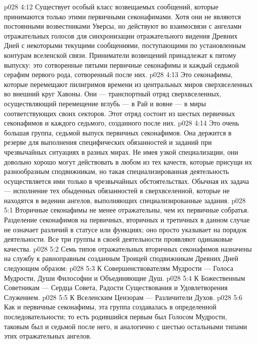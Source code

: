 \vs p028 4:12 \bibnobreakspace {} Существует особый класс возвещаемых сообщений, которые принимаются только этими первичными секонафимами. Хотя они не являются постоянными возвестниками Уверсы, но действуют во взаимосвязи с ангелами отражательных голосов для синхронизации отражательного видения Древних Дней с некоторыми текущими сообщениями, поступающими по установленным контурам вселенской связи. Приниматели возвещений принадлежат к пятому выпуску: это сотворенные пятыми первичные секонафимы и каждый седьмой серафим первого рода, сотворенный после них.
\vs p028 4:13 \bibnobreakspace {} Это секонафимы, которые перемещают пилигримов времени из центральных миров сверхвселенных во внешний круг Хавоны. Они --- транспортный отряд сверхвселенных, осуществляющий перемещение вглубь --- в Рай и вовне --- в миры соответствующих своих секторов. Этот отряд состоит из шестых первичных секонафимов и каждого седьмого, созданного после них.
\vs p028 4:14 \bibnobreakspace {} Это очень большая группа, седьмой выпуск первичных секонафимов. Она держится в резерве для выполнения специфических обязанностей и заданий при чрезвычайных ситуациях в разных мирах. Не имея узкой специализации, они довольно хорошо могут действовать в любом из тех качеств, которые присущи их разнообразным сподвижникам, но такая специализированная деятельность осуществляется ими только в чрезвычайных обстоятельствах. Обычная их задача --- исполнение тех обыденных обязанностей в сверхвселенной, которые не находятся в ведении ангелов, выполняющих специализированные задания.
\vs p028 5:1 Вторичные секонафимы не менее отражательны, чем их первичные собратья. Разделение секонафимов на первичных, вторичных и третичных в данном случае не означает различий в статусе или функциях; оно просто указывает на порядок деятельности. Все три группы в своей деятельности проявляют одинаковые качества.
\vs p028 5:2 \pc Семь типов отражательных вторичных секонафимов назначены на службу к равноправным созданным Троицей сподвижникам Древних Дней следующим образом:
\vs p028 5:3 К Совершенствователям Мудрости --- Голоса Мудрости, Души Философии и Объединяющие Душ.
\vs p028 5:4 К Божественным Советникам --- Сердца Совета, Радости Существования и Удовлетворения Служением.
\vs p028 5:5 К Вселенским Цензорам --- Различители Духов.
\vs p028 5:6 \pc Как и первичные секонафимы, эта группа создавалась в определенной последовательности; то есть родившийся первым был Голосом Мудрости, таковым был и седьмой после него, и аналогично с шестью остальными типами этих отражательных ангелов.
